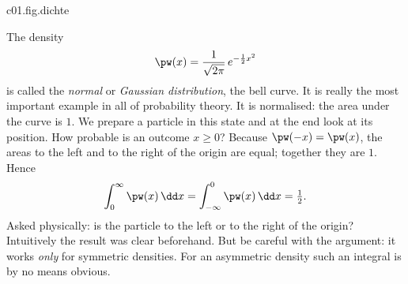 \begin{tpcfigure}{c01.fig.dichte}
  \caption{(a) The density of the Gaussian distribution of Example~\ref{c01.ex.gauss}. The
    probability that the outcome lies between real endpoints $a \leq b$ is the hatched
    area and not the height of the curve. (b) The uniform density of
    equation~\eqref{c01.eq.gleich}: it has height $2$, and the area under it is $1$.}
\end{tpcfigure}

\begin{example}\label{c01.ex.gauss}
  The density
  \begin{equation}\label{c01.eq.gauss}
    \pw(x) = \frac{1}{\sqrt{2\pi}}\, e^{-\frac12 x^2}
  \end{equation}
  is called the \emph{normal} or \emph{Gaussian distribution}, the bell curve. It is really
  the most important example in all of probability theory. It is normalised: the area under
  the curve is $1$. We prepare a particle in this state and at the end look
  at its position. How probable is an outcome $x \geq 0$? Because $\pw(-x) = \pw(x)$, the
  areas to the left and to the right of the origin are equal; together they are $1$.
  Hence
  \begin{equation}\label{c01.eq.gauss-halb}
    \int_0^\infty \pw(x)\,\dd x = \int_{-\infty}^0 \pw(x)\,\dd x = \tfrac12 .
  \end{equation}
  Asked physically: is the particle to the left or to the right of the origin? Intuitively
  the result was clear beforehand. But be careful with the argument: it works \emph{only}
  for symmetric densities. For an asymmetric density such an integral is by no means
  obvious.
\end{example}

